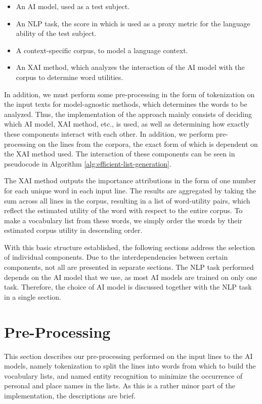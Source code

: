 \begin{itemize}
	\item An AI model, used as a test subject.
	\item An NLP task, the score in which is used as a proxy metric for the language ability of the test subject.
	\item A context-specific corpus, to model a language context.
	\item An XAI method, which analyzes the interaction of the AI model with the corpus to determine word utilities.
\end{itemize}

In addition, we must perform some pre-processing in the form of tokenization on the input texts for model-agnostic methods, which determines the words to be analyzed.
Thus, the implementation of the approach mainly consists of deciding which AI model, XAI method, etc., is used, as well as determining how exactly these components interact with each other.
In addition, we perform pre-processing on the lines from the corpora, the exact form of which is dependent on the XAI method used.
The interaction of these components can be seen in pseudocode in Algorithm \ref{alg:efficient-list-generation}.



The XAI method outputs the importance attributions in the form of one number for each unique word in each input line.
The results are aggregated by taking the sum across all lines in the corpus, resulting in a list of word-utility pairs, which reflect the estimated utility of the word with respect to the entire corpus.
To make a vocabulary list from these words, we simply order the words by their estimated corpus utility in descending order.

With this basic structure established, the following sections address the selection of individual components.
Due to the interdependencies between certain components, not all are presented in separate sections.
The NLP task performed depends on the AI model that we use, as most AI models are trained on only one task.
Therefore, the choice of AI model is discussed together with the NLP task in a single section.

\section{Pre-Processing}
This section describes our pre-processing performed on the input lines to the AI models, namely tokenization to split the lines into words from which to build the vocabulary lists, and named entity recognition to minimize the occurrence of personal and place names in the lists.
As this is a rather minor part of the implementation, the descriptions are brief.

